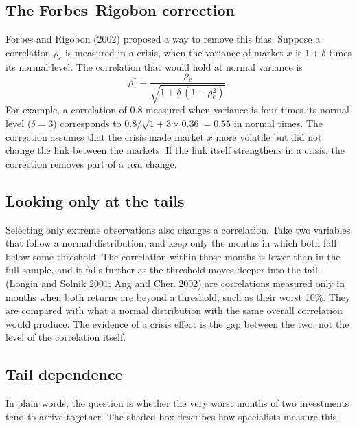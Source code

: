 \subsection{The Forbes--Rigobon correction}

Forbes and Rigobon (2002) proposed a way to remove this bias. Suppose a correlation $\rho_c$ is measured in a crisis, when the variance of market $x$ is $1 + \delta$ times its normal level. The correlation that would hold at normal variance is
\begin{equation}
  \rho^* = \frac{\rho_c}{\sqrt{1 + \delta\,(1 - \rho_c^2)}}.
  \label{eq:13-fr}
\end{equation}
For example, a correlation of 0.8 measured when variance is four times its normal level ($\delta = 3$) corresponds to $0.8/\sqrt{1 + 3 \times 0.36} = 0.55$ in normal times. The correction assumes that the crisis made market $x$ more volatile but did not change the link between the markets. If the link itself strengthens in a crisis, the correction removes part of a real change.

\subsection{Looking only at the tails}

Selecting only extreme observations also changes a correlation. Take two variables that follow a normal distribution, and keep only the months in which both fall below some threshold. The correlation within those months is lower than in the full sample, and it falls further as the threshold moves deeper into the tail.  (Longin and Solnik 2001; Ang and Chen 2002) are correlations measured only in months when both returns are beyond a threshold, such as their worst 10\%. They are compared with what a normal distribution with the same overall correlation would produce. The evidence of a crisis effect is the gap between the two, not the level of the correlation itself.

\subsection{Tail dependence}

In plain words, the question is whether the very worst months of two investments tend to arrive together. The shaded box describes how specialists measure this.


